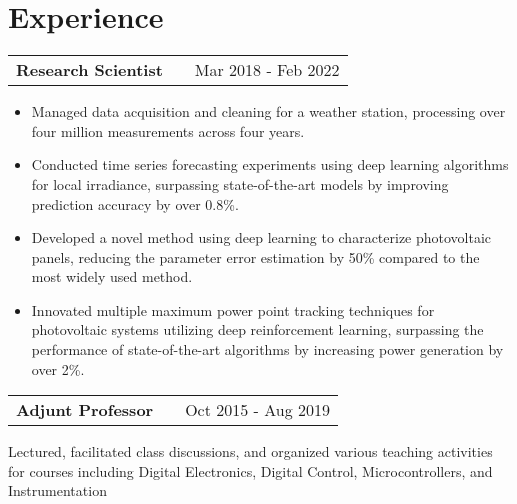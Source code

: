 \documentclass[a4paper,10pt]{article}
\makeatletter
\newenvironment{jobshort}[2]
    {
    \begin{tabularx}{\linewidth}{@{}l X r@{}}
    \textbf{#1} & \hfill &  #2 \\[3.75pt]
    \end{tabularx}
    }
    {
    }
\newenvironment{joblong}[2]
    {
    \begin{tabularx}{\linewidth}{@{}l X r@{}}
    \textbf{#1} & \hfill &  #2 \\[3.75pt]
    \end{tabularx}
    \begin{minipage}[t]{\linewidth}
    \begin{itemize}[nosep,after=\strut, leftmargin=1em, itemsep=3pt,label=--]
    }
    {
    \end{itemize}
    \end{minipage}    
    }
\makeatother
\begin{document}
\section{Experience}

\begin{joblong}{Research Scientist}{Mar 2018 - Feb 2022}
\item Managed data acquisition and cleaning for a weather station, processing over four million measurements across four years.
\item Conducted time series forecasting experiments using deep learning algorithms for local irradiance, surpassing state-of-the-art models by improving prediction accuracy by over 0.8\%.
\item Developed a novel method using deep learning to characterize photovoltaic panels, reducing the parameter error estimation by 50\% compared to the most widely used method.
\item Innovated multiple maximum power point tracking techniques for photovoltaic systems utilizing deep reinforcement learning, surpassing the performance of state-of-the-art algorithms by increasing power generation by over 2\%.
\end{joblong}

\begin{jobshort}{Adjunt Professor}{Oct 2015 - Aug 2019}
Lectured, facilitated class discussions, and organized various teaching activities for courses including Digital Electronics, Digital Control, Microcontrollers, and Instrumentation
\end{jobshort}



\end{document}
